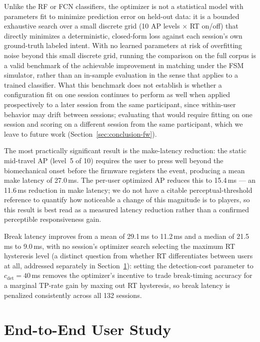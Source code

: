 Unlike the RF or FCN classifiers, the optimizer is not a statistical model
with parameters fit to minimize prediction error on held-out data: it is a
bounded exhaustive search over a small discrete grid (10 AP levels
$\times$ RT on/off) that directly minimizes a deterministic, closed-form loss
against each session's own ground-truth labeled intent. With no learned
parameters at risk of overfitting noise beyond this small discrete grid,
running the comparison on the full corpus is a valid benchmark of the
achievable improvement in matching under the FSM simulator, rather than an
in-sample evaluation in the sense that applies to a trained classifier. What
this benchmark does not establish is whether a configuration fit on one
session continues to perform as well when applied prospectively to a later
session from the same participant, since within-user behavior may drift
between sessions; evaluating that would require fitting on one session and
scoring on a different session from the same participant, which we leave to
future work (Section~\ref{sec:conclusion-fw}).

The most practically significant result is the make-latency reduction: the static
mid-travel AP (level~5 of 10) requires the user to press well beyond the biomechanical
onset before the firmware registers the event, producing a mean make latency of
27.0\,ms.  The per-user optimized AP reduces this to 15.4\,ms --- an 11.6\,ms
reduction in make latency; we do not have a citable perceptual-threshold
reference to quantify how noticeable a change of this magnitude is to
players, so this result is best read as a measured latency reduction rather
than a confirmed perceptible responsiveness gain.

Break latency improves from a mean of 29.1\,ms to 11.2\,ms and a median of 21.5\,ms to
9.0\,ms, with no session's optimizer search selecting the maximum RT hysteresis level
(a distinct question from whether RT differentiates between users at all, addressed
separately in Section~\ref{sec:eval-user-study}): setting the detection-cost
parameter to $c_\text{det}=40$\,ms removes the optimizer's incentive to trade
break-timing accuracy for a marginal TP-rate gain by maxing out RT hysteresis, so
break latency is penalized consistently across all 132 sessions.

\section{End-to-End User Study}
\label{sec:eval-user-study}

